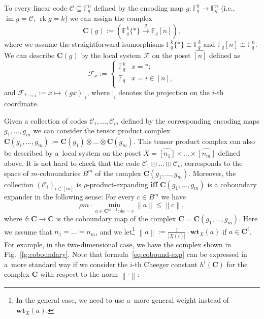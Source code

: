 \documentclass[11pt]{article}
\newcommand{\Iff}{\textbf{if\textcompwordmark f} }
\let\le\leqslant
\theoremstyle{plain}
\theoremstyle{definition}
\theoremstyle{remark}
\newcommand{\norm}[1]{\left\lVert#1\right\rVert}
\newcommand{\wt}{\mathbf{wt}}
\newcommand{\cC}{\mathcal{C}}
\newcommand{\cF}{\mathcal{F}}
\newcommand{\sC}{{\mathbf{C}}}
\newcommand{\F}{\mathbb{F}}
\DeclareMathOperator{\rk}{rk}
\DeclareMathOperator{\im}{im}
\begin{document}
To every linear code $\cC\subseteq \F_q^n$ defined by the encoding map $g\colon \F_q^k\to \F_q^n$ (i.e., $\im g = \cC$, $\rk g = k$) we can assign the complex 
\begin{equation}\label{eq:chain-g}
    \sC(g) := (\F_q^k\{*\} \xrightarrow{g} \F_q[n]),
\end{equation}
where we assume the straightforward isomorphisms $\F_q^k\{*\} \cong \F_q^k$ and $\F_q[n] \cong \F_q^n$. We can describe $\sC(g)$ by the local system $\cF$ on the poset $\widehat{[n]}$ defined as 
\[
\cF_x := \begin{cases} 
      \F_q^k & x = *; \\
      \F_q & x = i \in [n], \\
   \end{cases}
\]
and $\cF_{*\to i} := x \mapsto  (gx)|_i$, where $|_i$ denotes the projection on the $i$-th coordinate. 

Given a collection of codes $\cC_1,\dots,\cC_m$ defined by the corresponding encoding maps $g_1,\dots,g_m$ we can consider the tensor product complex $\sC(g_1,\dots,g_m) := \sC(g_1) \otimes \dots \otimes \sC(g_m)$. This tensor product complex can also be described by a~local system on the poset $X = \widehat{[n_1]}\times\dots\times \widehat{[n_m]}$ defined above. It is not hard to check that the code $\cC_1 \boxplus \dots \boxplus \cC_m$ corresponds to the space of $m$-coboundaries $B^{m}$ of the complex $\sC(g_1,\dots,g_m)$. Moreover, the collection $(\cC_i)_{i\in[m]}$ is $\rho$-product-expanding \Iff $\sC(g_1,\dots,g_m)$ is a coboundary expander in the following sense:
For every $c\in B^{m}$ we have 
\begin{equation}\label{eq:cobound-exp}
\rho m \cdot \min_{a\in \sC^{m-1}\colon \delta a = c}  \norm{a}  \le \norm{c},    
\end{equation}
where $\delta\colon \sC \to \sC$ is the coboundary map of the complex $\sC = \sC(g_1,\dots,g_m)$.
Here we assume that $n_1 = \dots = n_m$, and we let\footnote{In the general case, we need to use a~more general weight instead of $\wt_X(a)$.} $\norm{a} := \frac{1}{|X(i)|} \cdot \wt_X(a)$ if $a\in \sC^i$.
For example, in the two-dimensional case, we have the complex shown in Fig.~\ref{fg:coboundary}.  Note that formula~\ref{eq:cobound-exp} can be expressed in a~more standard way if we consider the $i$-th Cheeger constant $h^i(\sC)$ for the complex $\sC$ with respect to the norm $\norm{\cdot}$:
\end{document}
